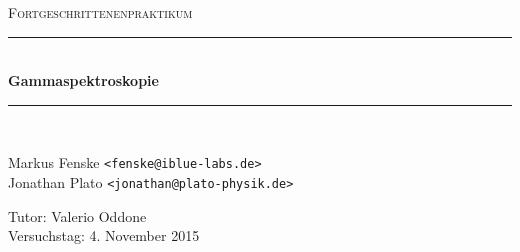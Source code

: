 \newcommand{\HRule}{\rule{\linewidth}{0.5mm}}

\begin{center}
  \textsc{\Large Fortgeschrittenenpraktikum}
  \HRule\\[0.4 cm]
  {\huge \bfseries Gammaspektroskopie}
  \HRule\\[0.4 cm]

  \begin{minipage}{0.60\textwidth}
  \begin{flushleft}
    Markus Fenske \texttt{<fenske@iblue-labs.de>} \\
    Jonathan Plato \texttt{<jonathan@plato-physik.de>}
  \end{flushleft}
  \end{minipage}
  \hfill
  \begin{minipage}{0.35\textwidth}
  \begin{flushright}
    Tutor: Valerio Oddone \\
    Versuchstag: 4. November 2015
  \end{flushright}
  \end{minipage}

  \vspace{1cm}

  \tableofcontents


  \vfill
\end{center}
\newpage
